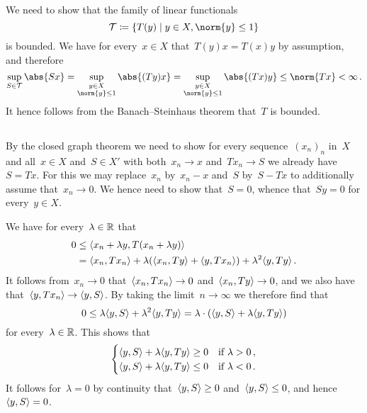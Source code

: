 \section{}





\subsection{}

We need to show that the family of linear functionals
\[
            \mathcal{T}
  \defined  \{
              T(y)
            \suchthat
              y \in X,
              \norm{y} \leq 1
            \}
\]
is bounded.
We have for every~$x \in X$ that~$T(y)x = T(x)y$ by assumption, and therefore
\[
        \sup_{S \in \mathcal{T}} \abs{ S x }
  =     \sup_{\substack{y \in X \\ \norm{y} \leq 1}} \abs{ (T y) x }
  =     \sup_{\substack{y \in X \\ \norm{y} \leq 1}} \abs{ (T x) y }
  \leq  \norm{T x}
  <     \infty  \,.
\]
It hence follows from the Banach--Steinhaus theorem that~$T$ is bounded.





\subsection{}

By the closed graph theorem we need to show for every sequence~$(x_n)_n$ in~$X$ and all~$x \in X$ and~$S \in X'$ with both~$x_n \to x$ and~$T x_n \to S$ we already have~$S = T x$.
For this we may replace~$x_n$ by~$x_n - x$ and~$S$ by~$S - T x$ to additionally assume that~$x_n \to 0$.
We hence need to show that~$S = 0$, whence that~$S y = 0$ for every~$y \in X$.

We have for every~$\lambda \in \mathbb{R}$ that
\begin{align*}
        0
  &\leq \langle x_n + \lambda y, T(x_n + \lambda y) \rangle \\
  &=    \langle x_n, T x_n\rangle + \lambda( \langle x_n, T y\rangle + \langle y, T x_n\rangle ) + \lambda^2 \langle y, T y\rangle \,.
\end{align*}
It follows from~$x_n \to 0$ that~$\langle x_n, T x_n\rangle \to 0$ and~$\langle x_n, T y\rangle \to 0$, and we also have that~$\langle y, Tx_n\rangle \to \langle y,S\rangle$.
By taking the limit~$n \to \infty$ we therefore find that
\[
        0
  \leq  \lambda \langle y, S\rangle + \lambda^2 \langle y, Ty\rangle
  =     \lambda \cdot ( \langle y, S\rangle + \lambda \langle y, Ty\rangle )
\]
for every~$\lambda \in \mathbb{R}$.
This shows that
\[
  \begin{cases}
    \langle y, S\rangle + \lambda \langle y, Ty\rangle \geq 0 & \text{if~$\lambda > 0$} \,, \\
    \langle y, S\rangle + \lambda \langle y, Ty\rangle \leq 0 & \text{if~$\lambda < 0$} \,.
  \end{cases}
\]
It follows for~$\lambda = 0$ by continuity that~$\langle y,S\rangle \geq 0$ and~$\langle y,S\rangle \leq 0$, and hence~$\langle y,S\rangle = 0$.




